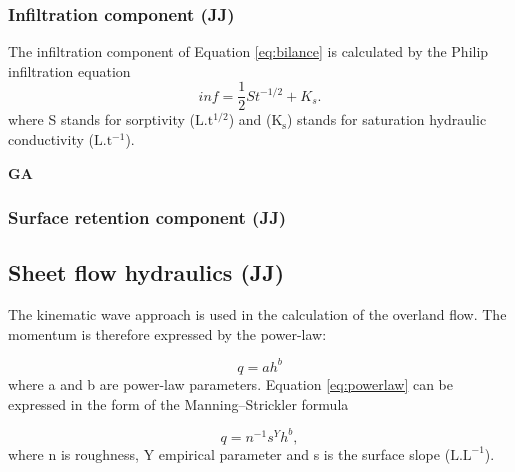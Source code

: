         \subsubsection{Infiltration component (JJ) }
            The infiltration component of Equation \ref{eq:bilance} is calculated by the
            Philip infiltration equation \citep{philip1957}
            \begin{equation} 
            inf = \frac{1}{2}St^{-1/2}+K_s.
            \label{eq:infiltration}
            \end{equation} 
            where S stands for sorptivity ($\mathrm{L.t^{1/2}}$) and ($\mathrm{K_s}$)
            stands for saturation hydraulic conductivity ($\mathrm{L.t^{-1}}$).

            {\bf GA}
 

 

        \subsubsection{Surface retention component (JJ)}
    \subsection{Sheet flow hydraulics (JJ)}
        The kinematic wave approach is used in the calculation of the overland flow.
        The momentum is therefore expressed by the power-law:

        \begin{equation} 
        q = ah^b
        \label{eq:powerlaw}
        \end{equation}
        where a and b are power-law parameters. Equation \ref{eq:powerlaw} can be
        expressed in the form of the Manning–Strickler formula


        \begin{equation} 
        q = n^{-1} s^Y h^b,
        \label{eq:powerlaw2}
        \end{equation}
        where n is roughness,  Y  empirical parameter and s is the surface
        slope ($\mathrm{L.L^{-1}}$).
